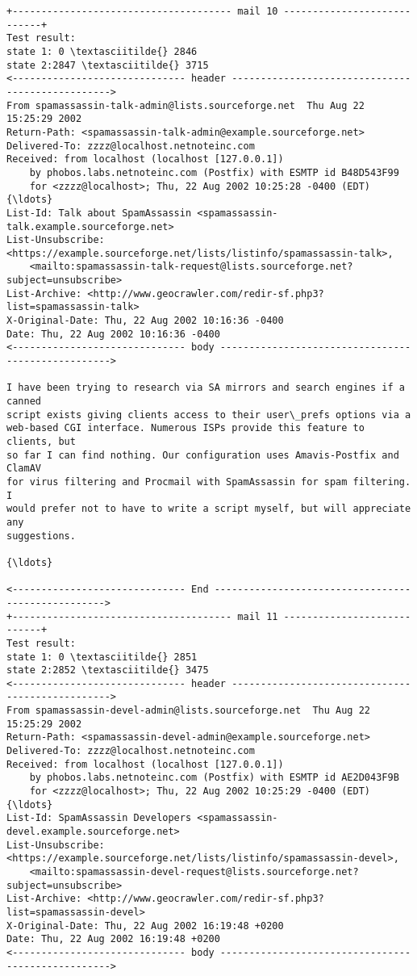 \documentclass[11pt]{article}
\begin{document}
    \begin{Verbatim}[commandchars=\\\{\}]
+-------------------------------------- mail 10 ----------------------------+
Test result:
state 1: 0 \textasciitilde{} 2846
state 2:2847 \textasciitilde{} 3715
<------------------------------ header ------------------------------------------------->
From spamassassin-talk-admin@lists.sourceforge.net  Thu Aug 22 15:25:29 2002
Return-Path: <spamassassin-talk-admin@example.sourceforge.net>
Delivered-To: zzzz@localhost.netnoteinc.com
Received: from localhost (localhost [127.0.0.1])
	by phobos.labs.netnoteinc.com (Postfix) with ESMTP id B48D543F99
	for <zzzz@localhost>; Thu, 22 Aug 2002 10:25:28 -0400 (EDT)
{\ldots}
List-Id: Talk about SpamAssassin <spamassassin-talk.example.sourceforge.net>
List-Unsubscribe: <https://example.sourceforge.net/lists/listinfo/spamassassin-talk>,
    <mailto:spamassassin-talk-request@lists.sourceforge.net?subject=unsubscribe>
List-Archive: <http://www.geocrawler.com/redir-sf.php3?list=spamassassin-talk>
X-Original-Date: Thu, 22 Aug 2002 10:16:36 -0400
Date: Thu, 22 Aug 2002 10:16:36 -0400
<------------------------------ body --------------------------------------------------->

I have been trying to research via SA mirrors and search engines if a canned
script exists giving clients access to their user\_prefs options via a
web-based CGI interface. Numerous ISPs provide this feature to clients, but
so far I can find nothing. Our configuration uses Amavis-Postfix and ClamAV
for virus filtering and Procmail with SpamAssassin for spam filtering. I
would prefer not to have to write a script myself, but will appreciate any
suggestions.

{\ldots}

<------------------------------ End --------------------------------------------------->
+-------------------------------------- mail 11 ----------------------------+
Test result:
state 1: 0 \textasciitilde{} 2851
state 2:2852 \textasciitilde{} 3475
<------------------------------ header ------------------------------------------------->
From spamassassin-devel-admin@lists.sourceforge.net  Thu Aug 22 15:25:29 2002
Return-Path: <spamassassin-devel-admin@example.sourceforge.net>
Delivered-To: zzzz@localhost.netnoteinc.com
Received: from localhost (localhost [127.0.0.1])
	by phobos.labs.netnoteinc.com (Postfix) with ESMTP id AE2D043F9B
	for <zzzz@localhost>; Thu, 22 Aug 2002 10:25:29 -0400 (EDT)
{\ldots}
List-Id: SpamAssassin Developers <spamassassin-devel.example.sourceforge.net>
List-Unsubscribe: <https://example.sourceforge.net/lists/listinfo/spamassassin-devel>,
    <mailto:spamassassin-devel-request@lists.sourceforge.net?subject=unsubscribe>
List-Archive: <http://www.geocrawler.com/redir-sf.php3?list=spamassassin-devel>
X-Original-Date: Thu, 22 Aug 2002 16:19:48 +0200
Date: Thu, 22 Aug 2002 16:19:48 +0200
<------------------------------ body --------------------------------------------------->


\end{Verbatim}
\end{document}
